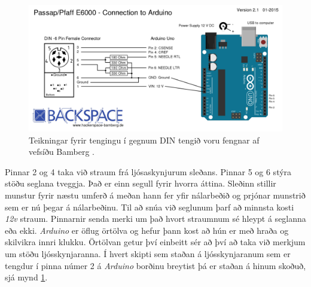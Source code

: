 \begin{figure}[H] %
    \centering
    \includegraphics[width=0.75\linewidth]{myndir/bambergDIN6.png}
    \caption{Teikningar fyrir tengingu í gegnum DIN tengið voru fengnar af vefsíðu Bamberg \cite{bamberg}. }
    \label{fig:bambergDIN6}
\end{figure}
Pinnar 2 og 4 taka við straum frá ljósaskynjurum sleðans. Pinnar 5 og 6 stýra stöðu seglana tveggja. 
Það er einn segull fyrir hvorra áttina. Sleðinn stillir munstur fyrir næstu umferð á meðan hann fer yfir nálarbeðið og prjónar  munstrið sem er nú þegar á nálarbeðinu. Til að snúa við seglunum þarf að minnsta kosti \textit{12v} straum. Pinnarnir senda merki um það hvort straumnum sé hleypt á seglanna eða ekki. \textit{Arduino} er öflug örtölva og hefur þann kost að hún er með hraða og skilvikra innri klukku. Örtölvan getur því einbeitt sér að því að taka við merkjum um stöðu ljósskynjaranna. 
Í hvert skipti sem staðan á ljósskynjaranum sem er tengdur í pinna númer 2 á \textit{Arduino} borðinu breytist þá er staðan á hinum skoðuð, sjá mynd \ref{fig:bambergDIN6}.

